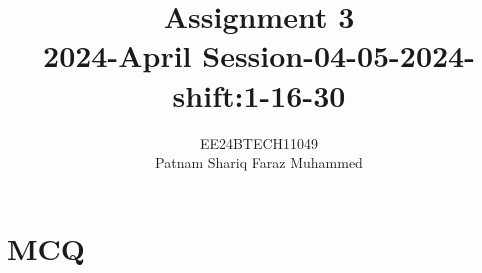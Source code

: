 \documentclass[journal]{IEEEtran}
\numberwithin{equation}{enumi}
\numberwithin{figure}{enumi}
\begin{document}


\title{Assignment 3 \\ 2024-April Session-04-05-2024-shift:1-16-30}
\author{EE24BTECH11049 \\ Patnam Shariq Faraz Muhammed}

{\let\newpage\relax\maketitle}

\section*{MCQ}
\end{document}
